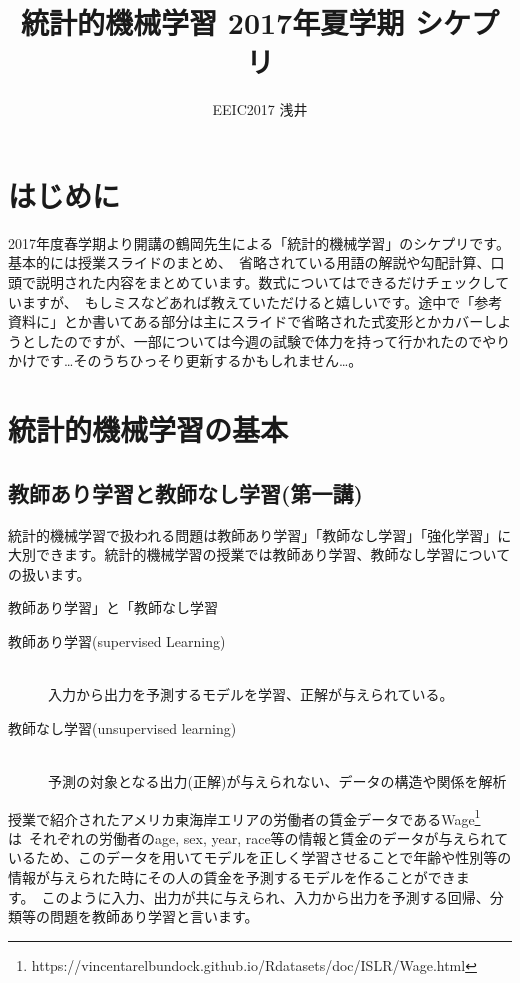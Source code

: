 \documentclass[uplatex]{jsarticle}
\title{統計的機械学習 2017年夏学期 シケプリ}
\author{EEIC2017 浅井}
\begin{document}
\maketitle

\section{はじめに}
2017年度春学期より開講の鶴岡先生による「統計的機械学習」のシケプリです。基本的には授業スライドのまとめ、\
省略されている用語の解説や勾配計算、口頭で説明された内容をまとめています。数式についてはできるだけチェックしていますが、\
もしミスなどあれば教えていただけると嬉しいです。途中で「参考資料に」とか書いてある部分は主にスライドで省略された式変形とかカバーしようとしたのですが、一部については今週の試験で体力を持って行かれたのでやりかけです…そのうちひっそり更新するかもしれません…。\

\section{統計的機械学習の基本}
\subsection{教師あり学習と教師なし学習(第一講)}
統計的機械学習で扱われる問題は教師あり学習」「教師なし学習」「強化学習」に大別できます。統計的機械学習の授業では教師あり学習、教師なし学習についての扱います。

\begin{itembox}[l]{教師あり学習」と「教師なし学習}
  \begin{description}
    \item [教師あり学習(supervised Learning)]\mbox{}\\
    入力から出力を予測するモデルを学習、正解が与えられている。
    \item [教師なし学習(unsupervised learning)]\mbox{}\\
    予測の対象となる出力(正解)が与えられない、データの構造や関係を解析
  \end{description}
\end{itembox}

授業で紹介されたアメリカ東海岸エリアの労働者の賃金データであるWage\footnote{https://vincentarelbundock.github.io/Rdatasets/doc/ISLR/Wage.html}は\
それぞれの労働者のage, sex, year, race等の情報と賃金のデータが与えられているため、このデータを用いてモデルを正しく学習させることで年齢や性別等の情報が与えられた時にその人の賃金を予測するモデルを作ることができます。\
このように入力、出力が共に与えられ、入力から出力を予測する回帰、分類等の問題を教師あり学習と言います。
\end{document}
